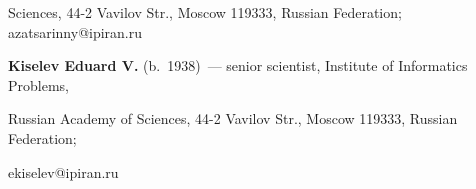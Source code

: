 Sciences, 44-2 Vavilov Str., Moscow 119333, Russian Federation; azatsarinny@ipiran.ru



\vspace*{3pt}



\noindent

\textbf{Kiselev Eduard V.} (b.\ 1938)~--- senior scientist, Institute of Informatics Problems,

Russian Academy of Sciences, 44-2 Vavilov Str., Moscow 119333, Russian Federation;

ekiselev@ipiran.ru











 \label{end\stat}



\renewcommand{\bibname}{\protect\rm Литература}









